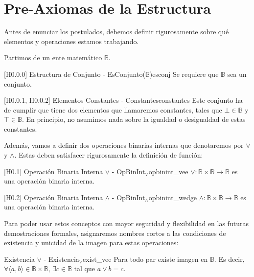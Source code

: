 \section{Pre-Axiomas de la Estructura}
Antes de enunciar los postulados, debemos definir rigurosamente sobre qué elementos y operaciones estamos trabajando. 

Partimos de un ente matemático $\mathbb{B}$.

\begin{preaxioma}{[H0.0.0] Estructura de Conjunto - EsConjunto($\mathbb{B}$)}{esconj}
Se requiere que $\mathbb{B}$ sea un conjunto.
\end{preaxioma}

\begin{preaxioma}{[H0.0.1, H0.0.2] Elementos Constantes - Constantes}{constantes}
Este conjunto ha de cumplir que tiene dos elementos que llamaremos constantes, tales que $\bot \in \mathbb{B}$ y $\top \in \mathbb{B}$. En principio, no asumimos nada sobre la igualdad o desigualdad de estas constantes.
\end{preaxioma}

Además, vamos a definir dos operaciones binarias internas que denotaremos por $\vee$ y $\wedge$. Estas deben satisfacer rigurosamente la definición de función:

\begin{preaxioma}{[H0.1] Operación Binaria Interna $\vee$ - OpBinInt$_\vee$}{opbinint_vee}
$\vee : \mathbb{B} \times \mathbb{B} \to \mathbb{B}$ es una operación binaria interna.
\end{preaxioma}

\begin{preaxioma}{[H0.2] Operación Binaria Interna $\wedge$ - OpBinInt$_\wedge$}{opbinint_wedge}
$\wedge : \mathbb{B} \times \mathbb{B} \to \mathbb{B}$ es una operación binaria interna.
\end{preaxioma}

Para poder usar estos conceptos con mayor seguridad y flexibilidad en las futuras demostraciones formales, asignaremos nombres cortos a las condiciones de existencia y unicidad de la imagen para estas operaciones:

\begin{preaxioma}{Existencia $\vee$ - Existencia$_\vee$}{exist_vee}
Para todo par existe imagen en $\mathbb{B}$. Es decir, $\forall \langle a,b \rangle \in \mathbb{B} \times \mathbb{B}$, $\exists c \in \mathbb{B}$ tal que $a \vee b = c$.
\end{preaxioma}

